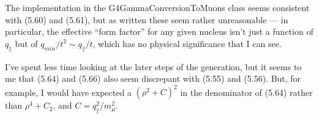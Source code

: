 \documentclass[11pt]{article}
\newcommand{\pal}{\parallel}
\begin{document}
The implementation in the G4GammaConversionToMuons class seems consistent with (5.60) and (5.61), but as written these seem rather unreasonable --- in particular, the effective ``form factor'' for any given nucleus isn't just a function of $q_\pal$ but of $q_{min}/t^2 \sim q_\pal/t$, which has no physical significance that I can see. 

I've spent less time looking at the later steps of the generation, but it seems to me that (5.64) and (5.66) also seem discrepant with (5.55) and (5.56).  But, for example, I would have expected a $(\rho^2 + C)^2$  in the denominator of (5.64) rather than $\rho^4+C_2$, and $C = q_\pal^2/m_\mu^2$.

\end{document}
